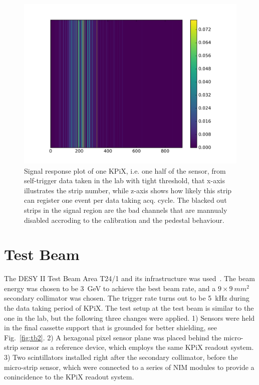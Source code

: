 \documentclass[conference]{IEEEtran}
\begin{document}
\begin{figure}[!ht]%
  \centering
  \includegraphics[width=1.0\linewidth]{pics/2018_07_13_16_34_20_strip_map_left.png}
  \caption{
  Signal response plot of one KPiX, i.e. one half of the sensor, from self-trigger data taken in the lab with tight threshold,
  that x-axis illustrates the strip number, while z-axis shows how likely this strip can register one event per data taking acq. cycle.
  The blacked out strips in the signal region are the bad channels that are mannualy disabled accroding to the calibration and the pedestal behaviour.
  }%
\label{fig:lab2}%
\end{figure}


\section{Test Beam}
The DESY II Test Beam Area T24/1 and its infrastructure was used~\cite{desytbf}.
The beam energy was chosen to be \SI{3}{GeV} to achieve the best beam rate, and a $9\times\SI{9}{mm^2}$ secondary collimator was chosen.
The trigger rate turns out to be \SI{5}{kHz} during the data taking period of KPiX.
The test setup at the test beam is similar to the one in the lab, but the following three changes were applied.
1) Sensors were held in the final cassette support that is grounded for better shielding, see Fig.~\ref{fig:tb2}.
2) A hexagonal pixel sensor plane was placed behind the micro-strip sensor as a reference device, which employs the same KPiX readout system.
3) Two scintillators installed right after the secondary collimator, before the micro-strip sensor, which were connected to a series of NIM modules to provide a conincidence to the KPiX readout system.
\end{document}
